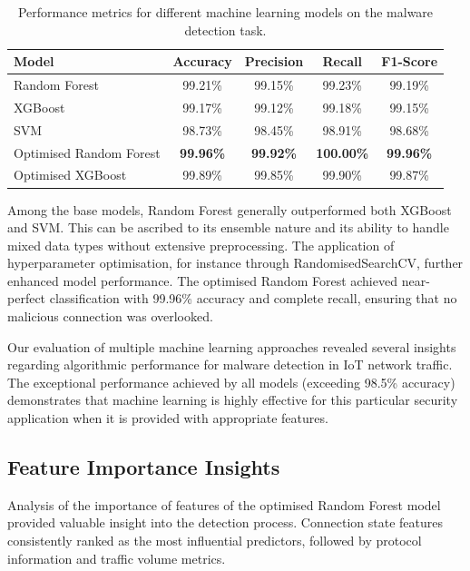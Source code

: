 \begin{table}[htbp]
    \center
    \begin{tabular}{lcccc}
    \hline
    \textbf{Model} & \textbf{Accuracy} & \textbf{Precision} & \textbf{Recall} & \textbf{F1-Score} \\
    \hline
    Random Forest             & 99.21\% & 99.15\% & 99.23\% & 99.19\% \\
    XGBoost                   & 99.17\% & 99.12\% & 99.18\% & 99.15\% \\
    SVM                       & 98.73\% & 98.45\% & 98.91\% & 98.68\% \\
    Optimised Random Forest   & \textbf{99.96\%} & \textbf{99.92\%} & \textbf{100.00\%} & \textbf{99.96\%} \\
    Optimised XGBoost         & 99.89\% & 99.85\% & 99.90\% & 99.87\% \\
    \hline
    \end{tabular}
    \caption{Performance metrics for different machine learning models on the malware detection task.}
    \label{tab:model_performance}
\end{table}

Among the base models, Random Forest generally outperformed both XGBoost and SVM. This can be ascribed to its ensemble nature and its ability to handle mixed data types without extensive preprocessing. The application of hyperparameter optimisation, for instance through RandomisedSearchCV, further enhanced model performance. The optimised Random Forest achieved near-perfect classification with 99.96\% accuracy and complete recall, ensuring that no malicious connection was overlooked.

Our evaluation of multiple machine learning approaches revealed several insights regarding algorithmic performance for malware detection in IoT network traffic. The exceptional performance achieved by all models (exceeding 98.5\% accuracy) demonstrates that machine learning is highly effective for this particular security application when it is provided with appropriate features.

\subsection{Feature Importance Insights}

Analysis of the importance of features of the optimised Random Forest model provided valuable insight into the detection process. Connection state features consistently ranked as the most influential predictors, followed by protocol information and traffic volume metrics.

